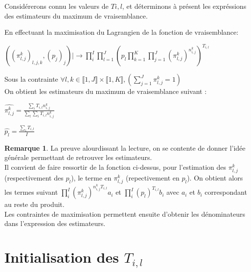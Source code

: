 \documentclass[frenchb]{report}
\newcommand{\1}{\mathbbm{1}}
\theoremstyle{definition}\newtheorem{defn}{Définition}
\theoremstyle{definition}\newtheorem{exm}{Exemple}
\theoremstyle{definition}\newtheorem{nota}{Notation}
\theoremstyle{definition}\newtheorem{rem}{Remarque}
\begin{document}
Considérerons connu les valeurs de $T{i,l}$, et déterminons à présent les expréssions des estimateurs du maximum de vraisemblance.
\bigskip

En effectuant la maximisation du Lagrangien de la fonction de vraisemblance: 

\begin{center}
	$\left( \left(\pi^k_{l,j}\right)_{l,j,k},(p_j)_j \right) |  \!\!\! \longrightarrow \displaystyle \prod_i^I \displaystyle \prod_{l=1}^J \left( p_l \displaystyle \prod_{k=1}^K \displaystyle \prod_{j = 1}^J \left(\pi^k_{l,j}\right)^{n^k_{i,j}} \right)^{T_{i,l}}$
\end{center}

Sous la contrainte $\forall l,k \in  \llbracket 1,J \rrbracket \times  \llbracket 1,K \rrbracket, \left(\displaystyle \sum_{j = 1}^J \pi^k_{l,j} = 1 \right)$\\

On obtient les estimateurs du maximum de vraisemblance suivant : \\

\begin{center} 
	$\widehat{\pi^{k}_{l,j}} = \displaystyle \frac{\displaystyle \sum_i T_{i,l} n^k_{i,j}}{\displaystyle \sum_l \displaystyle \sum_i T_{i,l} n^k_{i,j}}$
\end{center}
\begin{center}
	$\widehat{p_l} = \displaystyle \frac{\displaystyle \sum_i T_{i,l}}{I}$
\end{center}

\begin{rem}
	La preuve alourdissant la lecture, on se contente de donner l'idée générale permettant de retrouver les estimateurs. \\
Il convient de faire ressortir de la fonction ci-dessus, pour l'estimation des $\pi^k_{l,j}$ (respectivement des $p_l$), le terme en $\pi^k_{l,j}$ (repectivement en $p_l$). On obtient alors les termes suivant $\displaystyle \prod_i^I \left(\pi^k_{l,j}\right)^{n^k_{i,j}T_{i,l}} a_i$ et $\displaystyle \prod_i^I (p_l)^{T_{i,l}} b_i$ avec $a_i$ et $b_i$ correspondant au reste du produit.\\
Les contraintes de maximisation permettent ensuite d'obtenir les dénominateurs dans l'expression des estimateurs. 
\end{rem}
\bigskip
\bigskip
\bigskip





\section{Initialisation des $T_{i,l}$}
\end{document}

